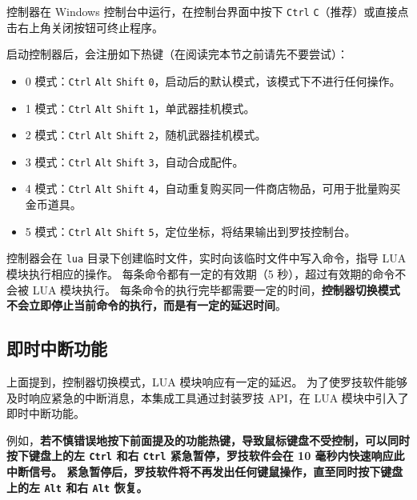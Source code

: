 控制器在 Windows 控制台中运行，在控制台界面中按下 \lstinline{Ctrl} \lstinline{C}（推荐）或直接点击右上角关闭按钮可终止程序。

启动控制器后，会注册如下热键（在阅读完本节之前请先不要尝试）：

\begin{itemize}

    \item 0 模式：\lstinline{Ctrl} \lstinline{Alt} \lstinline{Shift} \lstinline{0}，启动后的默认模式，该模式下不进行任何操作。

    \item 1 模式：\lstinline{Ctrl} \lstinline{Alt} \lstinline{Shift} \lstinline{1}，单武器挂机模式。

    \item 2 模式：\lstinline{Ctrl} \lstinline{Alt} \lstinline{Shift} \lstinline{2}，随机武器挂机模式。

    \item 3 模式：\lstinline{Ctrl} \lstinline{Alt} \lstinline{Shift} \lstinline{3}，自动合成配件。

    \item 4 模式：\lstinline{Ctrl} \lstinline{Alt} \lstinline{Shift} \lstinline{4}，自动重复购买同一件商店物品，可用于批量购买金币道具。

    \item 5 模式：\lstinline{Ctrl} \lstinline{Alt} \lstinline{Shift} \lstinline{5}，定位坐标，将结果输出到罗技控制台。

\end{itemize}

控制器会在 \lstinline{lua} 目录下创建临时文件，实时向该临时文件中写入命令，指导 LUA 模块执行相应的操作。
每条命令都有一定的有效期（5 秒），超过有效期的命令不会被 LUA 模块执行。
每条命令的执行完毕都需要一定的时间，\textbf{\color{red}控制器切换模式不会立即停止当前命令的执行，而是有一定的延迟时间}。

\subsection{即时中断功能}

上面提到，控制器切换模式，LUA 模块响应有一定的延迟。
为了使罗技软件能够及时响应紧急的中断消息，本集成工具通过封装罗技 API，在 LUA 模块中引入了即时中断功能。

例如，\textbf{\color{red}若不慎错误地按下前面提及的功能热键，导致鼠标键盘不受控制，可以同时按下键盘上的左 \lstinline{Ctrl} 和右 \lstinline{Ctrl} 紧急暂停，罗技软件会在 10 毫秒内快速响应此中断信号。
紧急暂停后，罗技软件将不再发出任何键鼠操作，直至同时按下键盘上的左 \lstinline{Alt} 和右 \lstinline{Alt} 恢复。}

